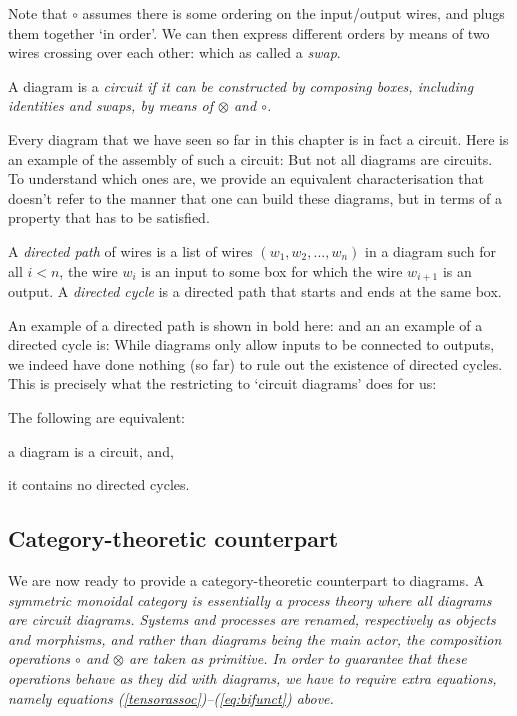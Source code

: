 \documentclass[10pt]{article}
\begin{document}
Note that $\circ$ assumes there is some ordering on the input/output wires, and plugs them together `in order'. We can then express different orders by means of two wires crossing over each other:
which as called a \textit{swap}.

\begin{definition} 
A diagram is a  \em circuit \em  if it  can be constructed  by composing boxes, including identities and swaps, by means of $\otimes$ and $\circ$.
\end{definition}

Every diagram that we have seen so far in this chapter is in fact a circuit.    Here is an example of the assembly of such a circuit:
But not all diagrams are circuits. To understand  which ones are, we provide an equivalent characterisation that doesn't refer to the manner that one can build these diagrams, but in terms of a property that has to be satisfied.  

\begin{definition}
  A \textit{directed path} of wires is a list of wires $(w_1, w_2, \ldots, w_n)$ in a diagram such for all $i < n$, the wire $w_i$ is an input to some box for which 
  the wire $w_{i+1}$ is an output.   A \textit{directed cycle} is a directed path that starts and ends at the same box. 
\end{definition}

An example of a directed path is shown in bold here:
and an an example of a directed cycle is:
While diagrams only allow inputs to be connected to outputs, we indeed have done nothing (so far) to rule out the existence of directed cycles. This is precisely what the restricting to `circuit diagrams' does for us:  

\begin{theorem}\label{thm:circuit-acyclic}
The following are equivalent:
\bit
\item a diagram is a circuit, and, 
\item it contains no directed cycles.
\eit
\end{theorem}

\subsection{Category-theoretic counterpart}

We are now ready to provide a category-theoretic counterpart to diagrams.  A  \em symmetric monoidal category \em is essentially a process theory where all diagrams are circuit diagrams. Systems and processes are renamed, respectively as \em objects \em  and \em morphisms\em, and rather than diagrams being the main actor, the composition operations $\circ$ and $\otimes$ are taken as primitive. In order to guarantee that these operations behave as they did with diagrams, we have to require extra equations, namely equations (\ref{tensorassoc})--(\ref{eq:bifunct}) above.
\end{document}
